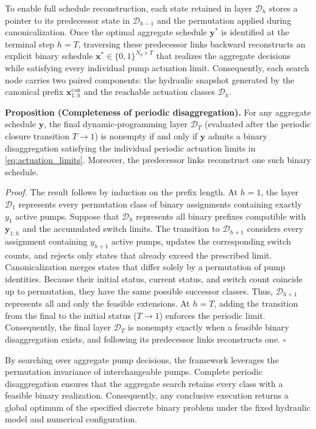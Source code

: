 \documentclass[Journal,letterpaper,InsideFigs]{ascelike-new}
\begin{document}
To enable full schedule reconstruction, each state retained in layer $\mathcal{D}_h$ stores a pointer to its predecessor state in $\mathcal{D}_{h-1}$ and the permutation applied during canonicalization. Once the optimal aggregate schedule $\mathbf{y}^*$ is identified at the terminal step $h=T$, traversing these predecessor links backward reconstructs an explicit binary schedule $\mathbf{x}^* \in \{0,1\}^{N_p \times T}$ that realizes the aggregate decisions while satisfying every individual pump actuation limit. Consequently, each search node carries two paired components: the hydraulic snapshot generated by the canonical prefix $\mathbf{x}_{1:h}^{\mathrm{can}}$ and the reachable actuation classes $\mathcal{D}_h$.

\bigskip
\noindent\textbf{Proposition (Completeness of periodic disaggregation).}
For any aggregate schedule $\mathbf{y}$, the final dynamic-programming layer $\mathcal{D}_T$ (evaluated after the periodic closure transition $T \to 1$) is nonempty if and only if $\mathbf{y}$ admits a binary disaggregation satisfying the individual periodic actuation limits in \eqref{eq:actuation_limits}. Moreover, the predecessor links reconstruct one such binary schedule.

\emph{Proof.}
The result follows by induction on the prefix length. At $h=1$, the layer $\mathcal{D}_1$ represents every permutation class of binary assignments containing exactly $y_1$ active pumps. Suppose that $\mathcal{D}_h$ represents all binary prefixes compatible with $\mathbf{y}_{1:h}$ and the accumulated switch limits. The transition to $\mathcal{D}_{h+1}$ considers every assignment containing $y_{h+1}$ active pumps, updates the corresponding switch counts, and rejects only states that already exceed the prescribed limit. Canonicalization merges states that differ solely by a permutation of pump identities. Because their initial status, current status, and switch count coincide up to permutation, they have the same possible successor classes. Thus, $\mathcal{D}_{h+1}$ represents all and only the feasible extensions. At $h=T$, adding the transition from the final to the initial status ($T \to 1$) enforces the periodic limit. Consequently, the final layer $\mathcal{D}_T$ is nonempty exactly when a feasible binary disaggregation exists, and following its predecessor links reconstructs one. \hfill\(\square\)

By searching over aggregate pump decisions, the framework leverages the permutation invariance of interchangeable pumps. Complete periodic disaggregation ensures that the aggregate search retains every class with a feasible binary realization. Consequently, any conclusive execution returns a global optimum of the specified discrete binary problem under the fixed hydraulic model and numerical configuration.
\end{document}

